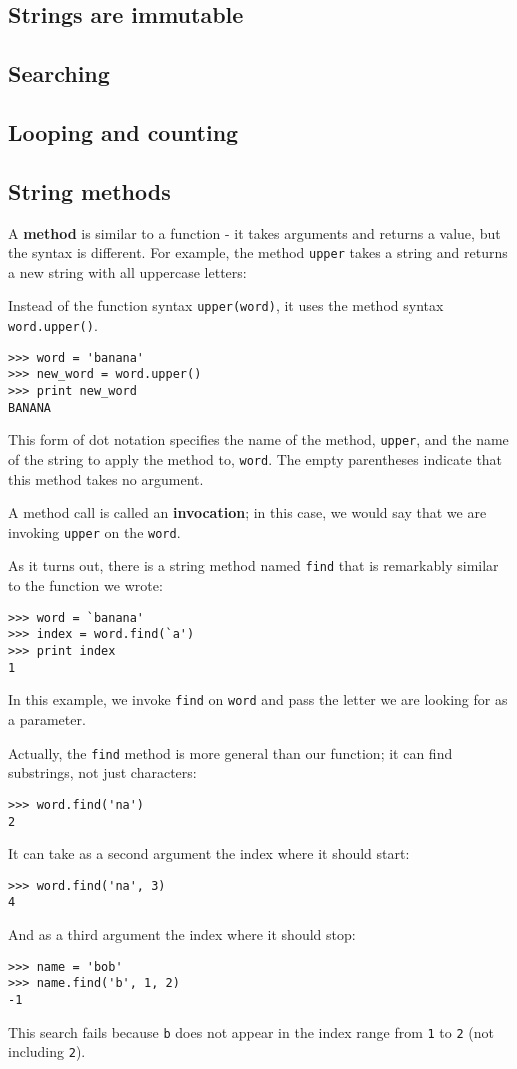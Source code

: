 \documentclass{article}
\begin{document}
\subsection{Strings are immutable}
\subsection{Searching}
\subsection{Looping and counting}
\subsection{String methods}
A \textbf{method} is similar to a function - it takes arguments and returns a
value, but the syntax is different. For example, the method
\verb|upper|
takes a string and returns a new string with all uppercase letters:
\par Instead of the function syntax \verb|upper(word)|,
it uses the method syntax \verb|word.upper()|.
\begin{verbatim}
>>> word = 'banana'
>>> new_word = word.upper()
>>> print new_word
BANANA
\end{verbatim}
\par This form of dot notation specifies the name of the method,
\verb|upper|, and the name of the string to apply the method to,
\verb|word|. The empty
parentheses indicate that this method takes no argument.
\par A method call is called an \textbf{invocation};
in this case, we would say that
we are invoking \verb|upper| on the \verb|word|.
\par As it turns out, there is a string method named \verb|find| that is
remarkably similar to the function we wrote:
\begin{verbatim}
>>> word = `banana'
>>> index = word.find(`a')
>>> print index
1
\end{verbatim}
\par In this example, we invoke \verb|find| on \verb|word|
and pass the letter we are looking for as a parameter.
\par Actually, the \verb|find| method is more general than our function; it can
find substrings, not just characters:
\begin{verbatim}
>>> word.find('na')
2
\end{verbatim}
\par It can take as a second argument the index where it should start:
\begin{verbatim}
>>> word.find('na', 3)
4
\end{verbatim}
\par And as a third argument the index where it should stop:
\begin{verbatim}
>>> name = 'bob'
>>> name.find('b', 1, 2)
-1
\end{verbatim}
\par This search fails because \verb|b| does not appear in the index range from
\verb|1| to \verb|2| (not including \verb|2|).
\end{document}
